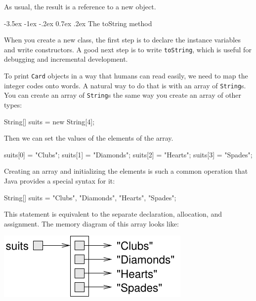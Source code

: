 \documentclass[12pt]{book}
\makeatletter
\theoremstyle{exercise}
\newcommand{\java}[1]{\verb"#1"}
\renewcommand{\section}{\@startsection{section}{1}{\z@}%
    {-3.5ex \@plus -1ex \@minus -.2ex}%
    {0.7ex \@plus.2ex}%
    {\normalfont\Large\bfseries}}
\newcommand{\java}[1]{\lstinline{#1}} %
\makeatother
\begin{document}
As usual, the result is a reference to a new object.


\section{The toString method}
\label{printcard}


When you create a new class, the first step is to declare the instance variables and write constructors.
A good next step is to write \java{toString}, which is useful for debugging and incremental development.


To print \java{Card} objects in a way that humans can read easily, we need to map the integer codes onto words.
A natural way to do that is with an array of \java{String}s.
You can create an array of \java{String}s the same way you create an array of other types:

\begin{code}
    String[] suits = new String[4];
\end{code}

Then we can set the values of the elements of the array.

\begin{code}
    suits[0] = "Clubs";
    suits[1] = "Diamonds";
    suits[2] = "Hearts";
    suits[3] = "Spades";
\end{code}

Creating an array and initializing the elements is such a common operation that Java provides a special syntax for it:

\begin{code}
    String[] suits = {"Clubs", "Diamonds", "Hearts", "Spades"};
\end{code}


This statement is equivalent to the separate declaration, allocation, and assignment.
The memory diagram of this array looks like:

\begin{center}
\includegraphics{figs/stringarray.pdf}
\end{center}
\end{document}
